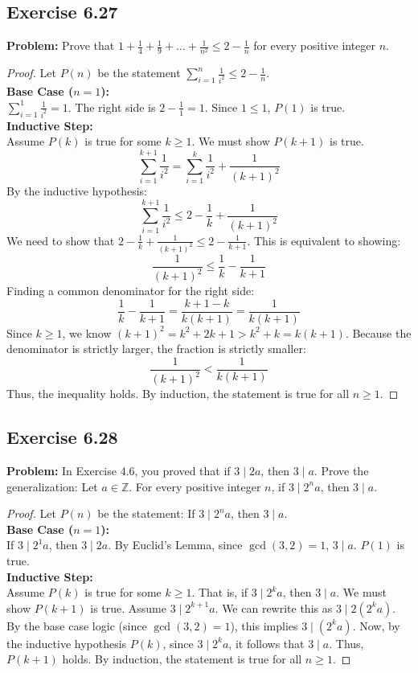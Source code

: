 \documentclass[11pt, a4paper]{article}
\theoremstyle{definition}
\theoremstyle{remark}
\newcommand{\Z}{\mathbb{Z}}
\begin{document}
\subsection{Exercise 6.27}
\textbf{Problem:} Prove that $1 + \frac{1}{4} + \frac{1}{9} + \dots + \frac{1}{n^2} \le 2 - \frac{1}{n}$ for every positive integer $n$.

\begin{proof}
Let $P(n)$ be the statement $\sum_{i=1}^n \frac{1}{i^2} \le 2 - \frac{1}{n}$.
\vspace{4pt} \\
\textbf{Base Case ($n = 1$):} \\
$\sum_{i=1}^1 \frac{1}{i^2} = 1$. The right side is $2 - \frac{1}{1} = 1$. Since $1 \le 1$, $P(1)$ is true.
\vspace{4pt} \\
\textbf{Inductive Step:} \\
Assume $P(k)$ is true for some $k \ge 1$. We must show $P(k+1)$ is true.
\[ \sum_{i=1}^{k+1} \frac{1}{i^2} = \sum_{i=1}^k \frac{1}{i^2} + \frac{1}{(k+1)^2} \]
By the inductive hypothesis:
\[ \sum_{i=1}^{k+1} \frac{1}{i^2} \le 2 - \frac{1}{k} + \frac{1}{(k+1)^2} \]
We need to show that $2 - \frac{1}{k} + \frac{1}{(k+1)^2} \le 2 - \frac{1}{k+1}$. This is equivalent to showing:
\[ \frac{1}{(k+1)^2} \le \frac{1}{k} - \frac{1}{k+1} \]
Finding a common denominator for the right side:
\[ \frac{1}{k} - \frac{1}{k+1} = \frac{k+1 - k}{k(k+1)} = \frac{1}{k(k+1)} \]
Since $k \ge 1$, we know $(k+1)^2 = k^2 + 2k + 1 > k^2 + k = k(k+1)$. 
Because the denominator is strictly larger, the fraction is strictly smaller:
\[ \frac{1}{(k+1)^2} < \frac{1}{k(k+1)} \]
Thus, the inequality holds. By induction, the statement is true for all $n \ge 1$.
\end{proof}

\subsection{Exercise 6.28}
\textbf{Problem:} In Exercise 4.6, you proved that if $3 \mid 2a$, then $3 \mid a$. Prove the generalization: Let $a \in \Z$. For every positive integer $n$, if $3 \mid 2^n a$, then $3 \mid a$.

\begin{proof}
Let $P(n)$ be the statement: If $3 \mid 2^n a$, then $3 \mid a$.
\vspace{4pt} \\
\textbf{Base Case ($n = 1$):} \\
If $3 \mid 2^1 a$, then $3 \mid 2a$. By Euclid's Lemma, since $\gcd(3, 2) = 1$, $3 \mid a$. $P(1)$ is true.
\vspace{4pt} \\
\textbf{Inductive Step:} \\
Assume $P(k)$ is true for some $k \ge 1$. That is, if $3 \mid 2^k a$, then $3 \mid a$. We must show $P(k+1)$ is true.
Assume $3 \mid 2^{k+1} a$. We can rewrite this as $3 \mid 2(2^k a)$. 
By the base case logic (since $\gcd(3, 2) = 1$), this implies $3 \mid (2^k a)$. 
Now, by the inductive hypothesis $P(k)$, since $3 \mid 2^k a$, it follows that $3 \mid a$. 
Thus, $P(k+1)$ holds. By induction, the statement is true for all $n \ge 1$.
\end{proof}
\end{document}
